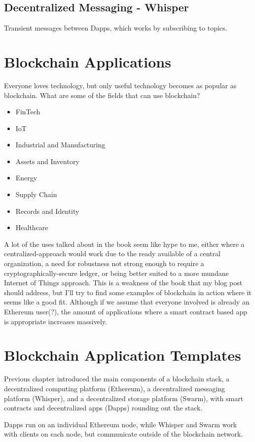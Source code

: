 \documentclass{article}
\begin{document}
\subsection{Decentralized Messaging - Whisper}
Transient messages between Dapps, which works by subscribing to topics.

\section{Blockchain Applications}

Everyone loves technology, but only useful technology becomes as popular as blockchain. What are some of the fields that can use blockchain?
\begin{itemize}
\item FinTech
\item IoT
\item Industrial and Manufacturing
\item Assets and Inventory
\item Energy
\item Supply Chain
\item Records and Identity
\item Healthcare
\end{itemize}

A lot of the uses talked about in the book seem like hype to me, either where a centralized-approach would work due to the ready available of a central organization, a need for robustness not strong enough to require a cryptographically-secure ledger, or being better suited to a more mundane Internet of Things approach. This is a weakness of the book that my blog post should address, but I'll try to find some examples of blockchain in action where it seems
like a good fit. Although if we assume that everyone involved is already an Ethereum user(?), the amount of applications where a smart contract based app is appropriate increases massively.

\section{Blockchain Application Templates}
Previous chapter introduced the main components of a blockchain stack, a decentralized computing platform (Ethereum), a decentralized messaging platform (Whisper), and a decentralized storage platform (Swarm), with smart contracts and decentralized apps (Dapps) rounding out the stack.

Dapps run on an individual Ethereum node, while Whisper and Swarm work with clients on each node, but communicate outside of the blockchain network.
\end{document}
